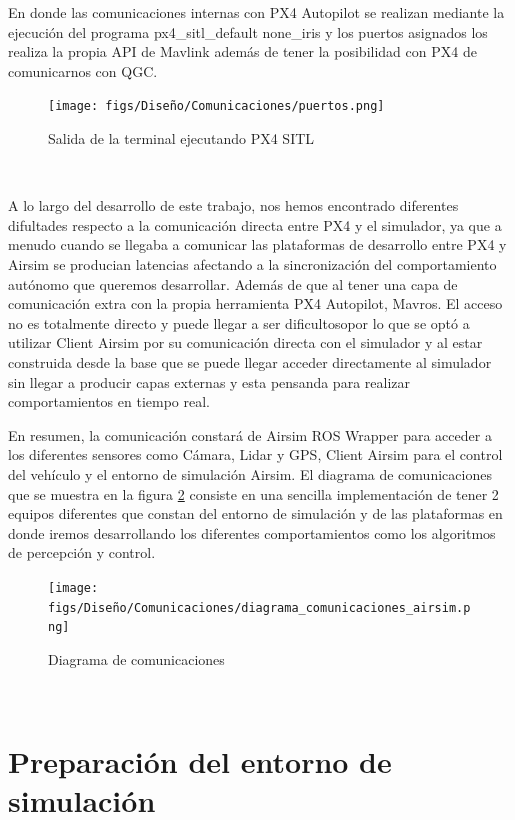 En donde las comunicaciones internas con PX4 Autopilot se realizan mediante la ejecución del programa px4\_sitl\_default none\_iris y los puertos asignados los realiza la propia
API de Mavlink además de tener la posibilidad con PX4 de comunicarnos con QGC.

\begin{figure} [H]
  \begin{center}
    \texttt{[image: figs/Diseño/Comunicaciones/puertos.png]}
  \end{center}
  \caption{Salida de la terminal ejecutando PX4 SITL}
  \label{fig:SalidaTerminal}
\end{figure}\

A lo largo del desarrollo de este trabajo, nos hemos encontrado diferentes difultades respecto a la comunicación directa entre PX4 y el simulador, ya que a menudo cuando se llegaba a 
comunicar las plataformas de desarrollo entre PX4 y Airsim se producian latencias afectando a la sincronización del comportamiento autónomo que queremos desarrollar. Además de que al tener
una capa de comunicación extra con la propia herramienta PX4 Autopilot, Mavros. El acceso no es totalmente directo y puede llegar a ser dificultosopor lo que se optó a utilizar 
Client Airsim por su comunicación directa con el simulador y al estar construida desde la base que se puede llegar acceder directamente al simulador sin llegar a producir capas externas y 
esta pensanda para realizar comportamientos en tiempo real. 

En resumen, la comunicación constará de Airsim ROS Wrapper para acceder a los diferentes sensores como Cámara, Lidar y GPS, Client Airsim para el control del vehículo y el entorno
de simulación Airsim. El diagrama de comunicaciones que se muestra en la figura \ref{fig:diagramadeAirsim} consiste en una sencilla implementación de tener 2 equipos diferentes que
constan del entorno de simulación y de las plataformas en donde iremos desarrollando los diferentes comportamientos como los algoritmos de percepción y control. 

\begin{figure} [H]
  \begin{center}
    \texttt{[image: figs/Diseño/Comunicaciones/diagrama\_comunicaciones\_airsim.png]}
  \end{center}
  \caption{Diagrama de comunicaciones}
  \label{fig:diagramadeAirsim}
\end{figure}\

\section{Preparación del entorno de simulación}
\label{sec:Preparación_entorno}

